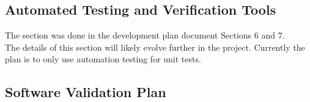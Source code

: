 \documentclass[12pt, titlepage]{article}
\begin{document}

\subsection{Automated Testing and Verification Tools}




The section was done in the development plan document Sections 6 and 7. \\

The details of this section will likely evolve further
in the project. Currently the plan is to only use 
automation testing for unit tests. 

\subsection{Software Validation Plan}

  
\end{document}
